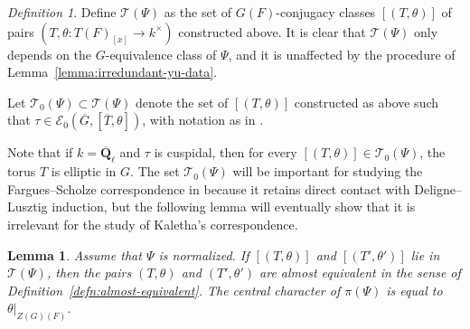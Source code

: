 \documentclass[reqno]{amsart}
\numberwithin{equation}{subsection}
\newcommand{\F}{\mathbf{F}}
\newcommand{\Q}{\mathbf{Q}}
\newcommand{\ol}[1]{\overline{#1}}
\newcommand{\co}{\colon}
\newcommand\cE{\mathcal{E}}
\newcommand\cT{\mathcal{T}}
\DeclareMathOperator{\SL}{SL}
\DeclareMathOperator{\red}{red}
\newtheorem{lemma}[thm]{Lemma}
\theoremstyle{remark}
\newtheorem{defn}[thm]{Definition}
\numberwithin{equation}{subsection}
\numberwithin{figure}{subsection}
\begin{document}



\begin{defn}\label{defn:associated-torus-character-pairs}
Define $\cT(\Psi)$ as the set of $G(F)$-conjugacy classes $[(T, \theta)]$ of pairs $(T, \theta\co T(F)_{[x]}\to k^\times)$ constructed above. It is clear that $\cT(\Psi)$ only depends on the $G$-equivalence class of $\Psi$, and it is unaffected by the procedure of Lemma~\ref{lemma:irredundant-yu-data}.

Let $\cT_0(\Psi) \subset \cT(\Psi)$ denote the set of $[(T,\theta)]$ constructed as above such that $\tau \in \cE_0(\ol G, [\ol T, \theta])$, with notation as in \cite[Definition~2.8.2]{Cot26b}.
\end{defn}

Note that if $k = \ol\Q_\ell$ and $\tau$ is cuspidal, then for every $[(T, \theta)] \in \cT_0(\Psi)$, the torus $T$ is elliptic in $G$. The set $\cT_0(\Psi)$ will be important for studying the Fargues--Scholze correspondence in \cite{CF26b} because it retains direct contact with Deligne--Lusztig induction, but the following lemma will eventually show that it is irrelevant for the study of Kaletha's correspondence.

\begin{lemma}\label{lemma:associated-tori-almost-equiv}
Assume that $\Psi$ is normalized. If $[(T, \theta)]$ and $[(T', \theta')]$ lie in $\cT(\Psi)$, then the pairs $(T,\theta)$ and $(T',\theta')$ are almost equivalent in the sense of Definition~\ref{defn:almost-equivalent}.
The central character of $\pi(\Psi)$ is equal to $\theta|_{Z(G)(F)}$.
\end{lemma}
\end{document}
